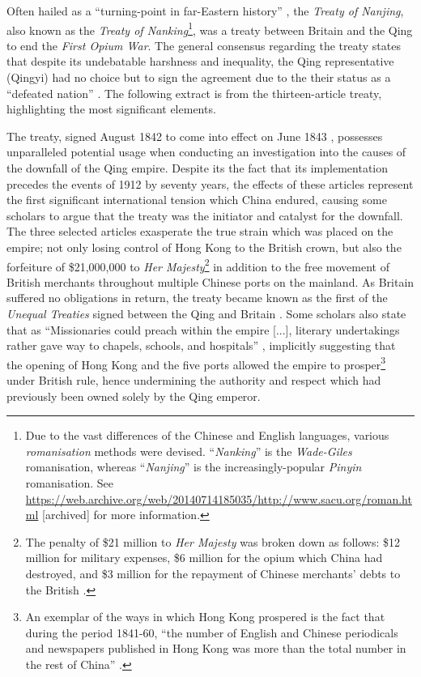 \documentclass{article}
\begin{document}
Often hailed as a ``turning-point in far-Eastern history''
\autocite{Fairbank:1940}, the \textit{Treaty of Nanjing}, also known as the \textit{Treaty of Nanking}\footnote{Due to the vast differences of the Chinese and English languages, various \textit{romanisation} methods were devised. ``\textit{Nanking}'' is the \textit{Wade-Giles} romanisation, whereas ``\textit{Nanjing}'' is the increasingly-popular \textit{Pinyin} romanisation. See \url{https://web.archive.org/web/20140714185035/http://www.sacu.org/roman.html} [archived] for more information.}, was a treaty between Britain and the Qing to end the \textit{First Opium War}. The general consensus regarding the treaty states that despite its undebatable harshness and inequality, the Qing representative (Qingyi) had no choice but to sign the agreement due to the their status as a ``defeated nation''
\autocite{Mao:2018}. The following extract is from the thirteen-article treaty, highlighting the most significant elements.


The treaty, signed  August 1842 to come into effect on  June 1843
\autocite{Saw:1975}, possesses unparalleled potential usage when conducting an investigation into the causes of the downfall of the Qing empire. Despite its the fact that its implementation precedes the events of 1912 by seventy years, the effects of these articles represent the first significant international tension which China endured, causing some scholars to argue that the treaty was the initiator and catalyst for the downfall. The three selected articles exasperate the true strain which was placed on the empire; not only losing control of Hong Kong to the British crown, but also the forfeiture of \$21,000,000 to \textit{Her Majesty}\footnote{The penalty of \$21 million to \textit{Her Majesty} was broken down as follows: \$12 million for military expenses, \$6 million for the opium which China had destroyed, and \$3 million for the repayment of Chinese merchants' debts to the British
\autocite{Hsu:1999}.} in addition to the free movement of British merchants throughout multiple Chinese ports on the mainland. As Britain suffered no obligations in return, the treaty became known as the first of the \textit{Unequal Treaties} signed between the Qing and Britain
\autocite{Hoe:1999}. Some scholars also state that as ``Missionaries could preach within the empire [...], literary undertakings rather gave way to chapels, schools, and hospitals''
\autocite{Britton:1933}, implicitly suggesting that the opening of Hong Kong and the five ports allowed the empire to prosper\footnote{An exemplar of the ways in which Hong Kong prospered is the fact that during the period 1841-60, ``the number of English and Chinese periodicals and newspapers published in Hong Kong was more than the total number in the rest of China''
\autocite{Huang:2001}.} under British rule, hence undermining the authority and respect which had previously been owned solely by the Qing emperor.
\end{document}
